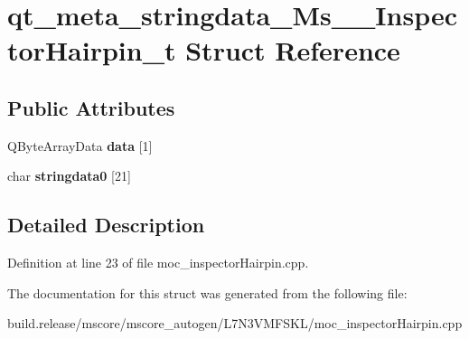 \hypertarget{structqt__meta__stringdata___ms_____inspector_hairpin__t}{}\section{qt\+\_\+meta\+\_\+stringdata\+\_\+\+Ms\+\_\+\+\_\+\+Inspector\+Hairpin\+\_\+t Struct Reference}
\label{structqt__meta__stringdata___ms_____inspector_hairpin__t}
\subsection*{Public Attributes}
\begin{DoxyCompactItemize}
\item 
\mbox{\label{structqt__meta__stringdata___ms_____inspector_hairpin__t_aec38cce7885828a9b9389db15ed23d90}} 
Q\+Byte\+Array\+Data {\bfseries data} \mbox{[}1\mbox{]}
\item 
\mbox{\label{structqt__meta__stringdata___ms_____inspector_hairpin__t_a824da2ca253a921f4e5d4bce3e30e6cc}} 
char {\bfseries stringdata0} \mbox{[}21\mbox{]}
\end{DoxyCompactItemize}


\subsection{Detailed Description}


Definition at line 23 of file moc\+\_\+inspector\+Hairpin.\+cpp.



The documentation for this struct was generated from the following file\+:\begin{DoxyCompactItemize}
\item 
build.\+release/mscore/mscore\+\_\+autogen/\+L7\+N3\+V\+M\+F\+S\+K\+L/moc\+\_\+inspector\+Hairpin.\+cpp\end{DoxyCompactItemize}
